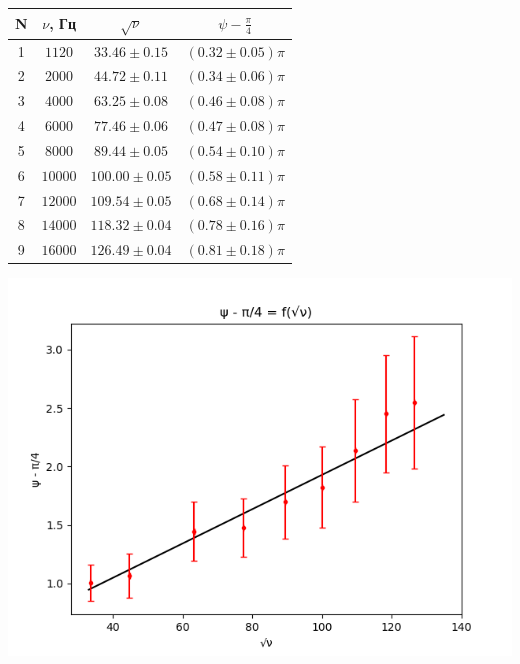\documentclass{article}
\begin{document}
\begin{center}
    \begin{tabular}{|c|c|c|c|}
        \hline
        N & $\nu$, Гц  & $ \sqrt{\nu}        $ & $\psi - \frac{\pi}{4}$ \\ \hline
        1  & $ 1120  $ & $ 33.46  \pm 0.15 $ & $ (0.32 \pm 0.05)\pi $ \\ \hline
        2  & $ 2000  $ & $ 44.72  \pm 0.11 $ & $ (0.34 \pm 0.06)\pi $ \\ \hline
        3  & $ 4000  $ & $ 63.25  \pm 0.08 $ & $ (0.46 \pm 0.08)\pi $ \\ \hline
        4  & $ 6000  $ & $ 77.46  \pm 0.06 $ & $ (0.47 \pm 0.08)\pi $ \\ \hline
        5  & $ 8000  $ & $ 89.44  \pm 0.05 $ & $ (0.54 \pm 0.10)\pi $ \\ \hline
        6  & $ 10000 $ & $ 100.00 \pm 0.05 $ & $ (0.58 \pm 0.11)\pi $ \\ \hline
        7  & $ 12000 $ & $ 109.54 \pm 0.05 $ & $ (0.68 \pm 0.14)\pi $ \\ \hline
        8  & $ 14000 $ & $ 118.32 \pm 0.04 $ & $ (0.78 \pm 0.16)\pi $ \\ \hline
        9  & $ 16000 $ & $ 126.49 \pm 0.04 $ & $ (0.81 \pm 0.18)\pi $ \\ \hline
    \end{tabular}
\end{center}


\includegraphics[width=\linewidth]{psi.png}
\end{document}
